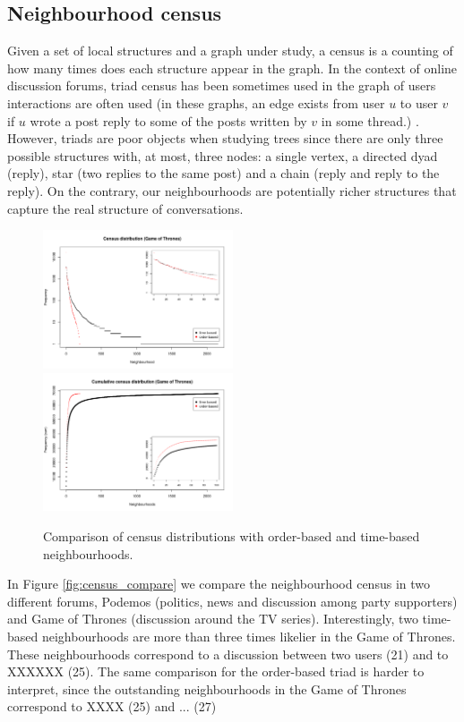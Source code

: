 \documentclass[conference]{IEEEtran}
\begin{document}
\subsection{Neighbourhood census}
Given a set of local structures and a graph under study, a census is a counting of how many times does each structure appear in the graph. In the context of online discussion forums, triad census has been sometimes used in the graph of users interactions are often used (in these graphs, an edge exists from user $u$ to user $v$ if $u$ wrote a post reply to some of the posts written by $v$ in some thread.) \cite{Adamic2008, Lumbreras2013}. However, triads are poor objects when studying trees since there are only three possible structures with, at most, three nodes: a single vertex, a directed dyad (reply), star (two replies to the same post) and a chain (reply and reply to the reply). On the contrary, our neighbourhoods are potentially richer structures that capture the real structure of conversations.

\begin{figure}
\centering
\includegraphics[width=0.5\textwidth]{order_vs_time_census_distribution}%
\includegraphics[width=0.5\textwidth]{order_vs_time_census_distribution_cum}
\caption{Comparison of census distributions with order-based and time-based neighbourhoods.}
\label{fig:census_distributions}
\end{figure}


In Figure \ref{fig:census_compare} we compare the neighbourhood census in two different forums, Podemos (politics, news and discussion among party supporters) and Game of Thrones (discussion around the TV series). Interestingly, two time-based neighbourhoods are  more than three times likelier in the Game of Thrones. These neighbourhoods correspond to a discussion between two users (21) and to XXXXXX (25). The same comparison for the order-based triad is harder to interpret, since the outstanding neighbourhoods in the Game of Thrones correspond to XXXX (25) and ... (27)
\end{document}

